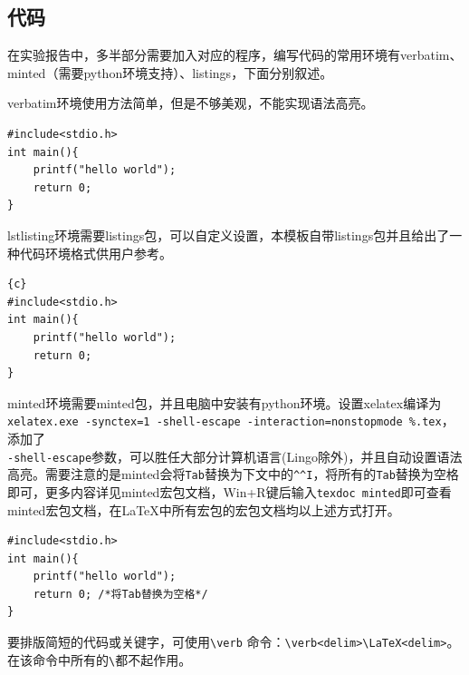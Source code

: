 \subsection{代码}
在实验报告中，多半部分需要加入对应的程序，编写代码的常用环境有verbatim、minted（需要python环境支持）、listings，下面分别叙述。

verbatim环境使用方法简单，但是不够美观，不能实现语法高亮。
\begin{verbatim}
#include<stdio.h>
int main(){
	printf("hello world");
	return 0;
}
\end{verbatim}

lstlisting环境需要listings包，可以自定义设置，本模板自带listings包并且给出了一种代码环境格式供用户参考。
\begin{lstlisting}{c}
#include<stdio.h>
int main(){
	printf("hello world");
	return 0;
}
\end{lstlisting}

minted环境需要minted包，并且电脑中安装有python环境。设置xelatex编译为\\\verb|xelatex.exe -synctex=1 -shell-escape -interaction=nonstopmode %.tex|，添加了\\\verb|-shell-escape|参数，可以胜任大部分计算机语言(Lingo除外)，并且自动设置语法高亮。需要注意的是minted会将\verb|Tab|替换为下文中的\verb|^^I|，将所有的\verb|Tab|替换为空格即可，更多内容详见minted宏包文档，Win+R键后输入\verb|texdoc minted|即可查看minted宏包文档，在\LaTeX 中所有宏包的宏包文档均以上述方式打开。
\begin{verbatim}
#include<stdio.h>
int main(){
	printf("hello world");
    return 0; /*将Tab替换为空格*/
}
\end{verbatim}

要排版简短的代码或关键字，可使用\verb|\verb| 命令：\verb|\verb<delim>\LaTeX<delim>|。
在该命令中所有的\verb|\|都不起作用。